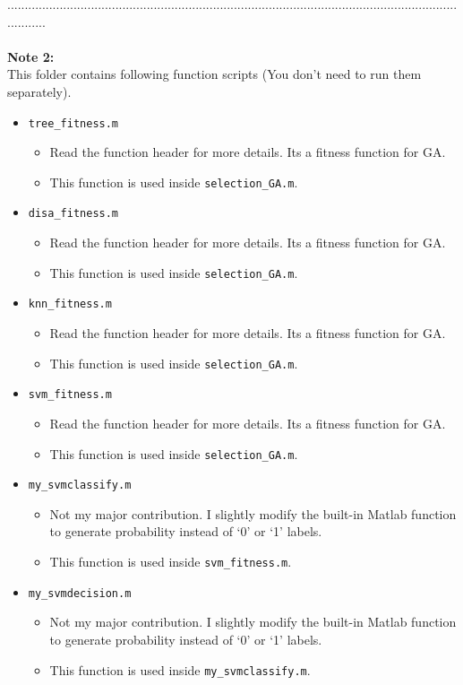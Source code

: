 \documentclass[a4paper,12pt]{article} %
\begin{document}
............................................................................................................................................\\\\
\textbf{Note 2: }\\
This folder contains following function scripts (You don't need to run them separately).
\begin{itemize}
		\item \verb|tree_fitness.m|
		\begin{itemize}
			\item Read the function header for more details. Its a fitness function for GA.
			\item This function is used inside \verb|selection_GA.m|.
		\end{itemize}
		\item \verb|disa_fitness.m|
		\begin{itemize}
			\item Read the function header for more details. Its a fitness function for GA.
			\item This function is used inside \verb|selection_GA.m|.
		\end{itemize}
		\item \verb|knn_fitness.m|
		\begin{itemize}
			\item Read the function header for more details. Its a fitness function for GA.
			\item This function is used inside \verb|selection_GA.m|.
		\end{itemize}
		\item \verb|svm_fitness.m|
		\begin{itemize}
			\item Read the function header for more details. Its a fitness function for GA.
			\item This function is used inside \verb|selection_GA.m|.
		\end{itemize}
		
		\item \verb|my_svmclassify.m|
		\begin{itemize}
			\item Not my major contribution. I slightly modify the built-in Matlab function to generate probability instead of `0' or `1' labels. 
			\item This function is used inside \verb|svm_fitness.m|.
		\end{itemize}
		\item \verb|my_svmdecision.m|
		\begin{itemize}
			\item Not my major contribution. I slightly modify the built-in Matlab function to generate probability instead of `0' or `1' labels. 
			\item This function is used inside \verb|my_svmclassify.m|.
		\end{itemize}
\end{itemize}
\end{document}

